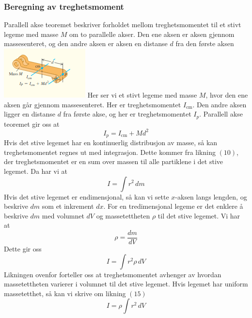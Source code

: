 \subsubsection{Beregning av treghetsmoment}
Parallell akse teoremet beskriver forholdet mellom treghetsmomentet til et stivt legeme med masse $M$ om to parallelle akser. Den ene aksen er aksen gjennom massesenteret, og den andre aksen er aksen en distanse $d$ fra den første aksen
\includegraphics{rapport/teori/bilder/parallell.png}\newline
Her ser vi et stivt legeme med masse $M$, hvor den ene aksen går gjennom massesenteret. Her er treghetsmomentet $I_\text{cm}$. Den andre aksen ligger en distanse $d$ fra første akse, og her er treghetsmomentet $I_p.$\cite{FYSIKK:1} Parallell akse teoremet gir oss at
\begin{equation}
    I_p=I_\text{cm}+Md^2
\end{equation}
Hvis det stive legemet har en kontinuerlig distribusjon av masse, så kan treghetsmomentet regnes ut med integrasjon. Dette kommer fra likning $(10)$, der treghetsmomentet er en sum over massen til alle partiklene i det stive legemet. Da har vi at
\begin{equation}
    I=\int{r^2\,dm}
\end{equation}
Hvis det stive legemet er endimensjonal, så kan vi sette $x$-aksen langs lengden, og beskrive $dm$ som et inkrement $dx.$ For en tredimensjonal legeme er det enklere å beskrive $dm$ med volumnet $dV$ og massetettheten $\rho$ til det stive legemet. Vi har at
\begin{equation}
    \rho=\frac{dm}{dV}
\end{equation}
Dette gir oss
\begin{equation}
    I=\int{r^2\rho\,dV}
\end{equation}
Likningen ovenfor forteller oss at treghetsmomentet avhenger av hvordan massetettheten varierer i volumnet til det stive legemet. Hvis legemet har uniform massetetthet, så kan vi skrive om likning $(15)$
\begin{equation}
    I=\rho\int{r^2\,dV}
\end{equation}